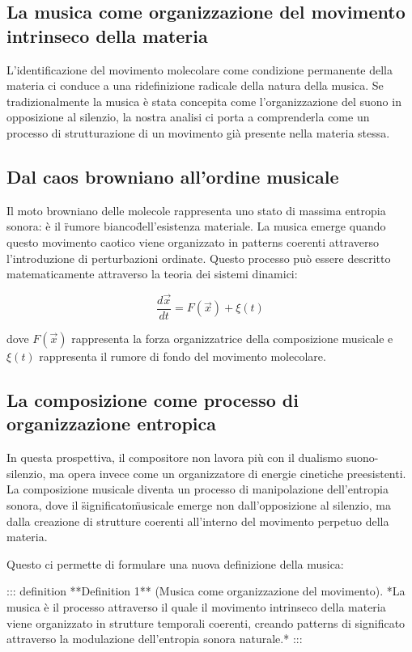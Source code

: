 \documentclass[a4paper,11pt]{article}
\begin{document}
\subsection{La musica come organizzazione del movimento intrinseco della materia}

L'identificazione del movimento molecolare come condizione permanente
della materia ci conduce a una ridefinizione radicale della natura della
musica. Se tradizionalmente la musica è stata concepita come
l'organizzazione del suono in opposizione al silenzio, la nostra analisi
ci porta a comprenderla come un processo di strutturazione di un
movimento già presente nella materia stessa.

\subsection{Dal caos browniano all'ordine musicale}

Il moto browniano delle molecole rappresenta uno stato di massima
entropia sonora: è il \"rumore bianco\" dell'esistenza materiale. La
musica emerge quando questo movimento caotico viene organizzato in
patterns coerenti attraverso l'introduzione di perturbazioni ordinate.
Questo processo può essere descritto matematicamente attraverso la
teoria dei sistemi dinamici:

\begin{equation}
\frac{d\vec{x}}{dt} = F(\vec{x}) + \xi(t)
\end{equation}


dove $F(\vec{x})$ rappresenta la forza organizzatrice della composizione
musicale e $\xi(t)$ rappresenta il rumore di fondo del movimento
molecolare.

\subsection{La composizione come processo di organizzazione entropica}

In questa prospettiva, il compositore non lavora più con il dualismo
suono-silenzio, ma opera invece come un organizzatore di energie
cinetiche preesistenti. La composizione musicale diventa un processo di
manipolazione dell'entropia sonora, dove il \"significato\" musicale
emerge non dall'opposizione al silenzio, ma dalla creazione di strutture
coerenti all'interno del movimento perpetuo della materia.

Questo ci permette di formulare una nuova definizione della musica:

::: definition
**Definition 1** (Musica come organizzazione del movimento). *La musica
è il processo attraverso il quale il movimento intrinseco della materia
viene organizzato in strutture temporali coerenti, creando patterns di
significato attraverso la modulazione dell'entropia sonora naturale.*
:::
\end{document}
